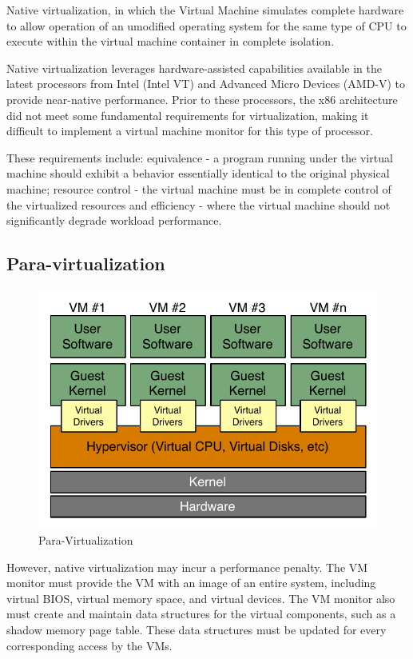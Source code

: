 Native virtualization, in which the Virtual Machine simulates complete hardware
to allow operation of an umodified operating system for the same type of CPU to
execute within the virtual machine container in complete isolation.

Native virtualization leverages hardware-assisted capabilities available in the
latest processors from Intel (Intel VT) and Advanced Micro Devices (AMD-V) to
provide near-native performance. Prior to these processors, the x86
architecture did not meet some fundamental requirements for virtualization,
making it difficult to implement a virtual machine monitor for this type of
processor.

These requirements include: equivalence - a program running under the virtual
machine should exhibit a behavior essentially identical to the original
physical machine; resource control - the virtual machine must be in complete
control of the virtualized resources and efficiency - where the virtual machine
should not significantly degrade workload performance.~\cite{wp-native-virt}

\subsection{Para-virtualization}

\begin{figure}[htb]
	\center
	\includegraphics[scale=0.75]{intro/para-virtualization}
	\caption{Para-Virtualization}
\end{figure}

However, native virtualization may incur a performance penalty.  The VM monitor
must provide the VM with an image of an entire system, including virtual BIOS,
virtual memory space, and virtual devices. The VM monitor also must create and
maintain data structures for the virtual components, such as a shadow memory
page table. These data structures must be updated for every corresponding
access by the VMs.

